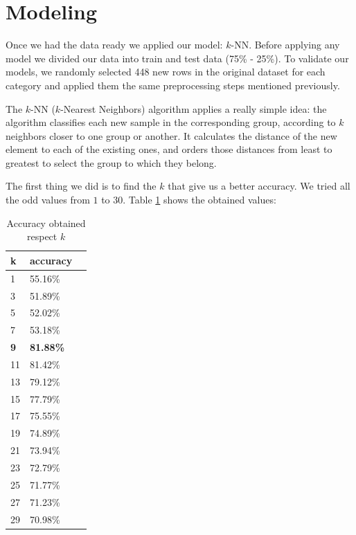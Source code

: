 \documentclass{article}
\begin{document}
\section{Modeling} 
\label{Modeling}
Once we had the data ready we applied our model: $k$-NN\cite{KNN}. Before applying any model we divided our data into train and test data (75\% - 25\%). To validate our models, we randomly selected 448 new rows in the original dataset for each category and applied them the same preprocessing steps mentioned previously.

The $k$-NN ($k$-Nearest Neighbors) algorithm applies a really simple idea: the algorithm classifies each new sample in the corresponding group, according to $k$ neighbors closer to one group or another. It calculates the distance of the new element to each of the existing ones, and orders those distances from least to greatest to select the group to which they belong.

The first thing we did is to find the $k$ that give us a better accuracy. We tried all the odd values from $1$ to $30$. Table \ref{tab:knn_results} shows the obtained values:

\begin{table}[ht]
    \centering
    \begin{tabular}{|l|l|l|}
        \hline
        \textbf{k} & \textbf{accuracy}  \\
        \hline
        1 & 55.16\% \\
        \hline
        3 & 51.89\% \\
        \hline
        5 & 52.02\% \\
        \hline
        7 & 53.18\% \\
        \hline
        \textbf{9} & \textbf{81.88\%} \\
        \hline
        11 & 81.42\% \\
        \hline
        13 & 79.12\% \\
        \hline
        15 & 77.79\% \\
        \hline
        17 & 75.55\% \\
        \hline
        19 & 74.89\% \\
        \hline
        21 & 73.94\% \\
        \hline
        23 & 72.79\% \\
        \hline
        25 & 71.77\% \\
        \hline
        27 & 71.23\% \\
        \hline
        29 & 70.98\% \\
        \hline
    \end{tabular}
    \caption{Accuracy obtained respect $k$}
    \label{tab:knn_results}
\end{table}
\end{document}
